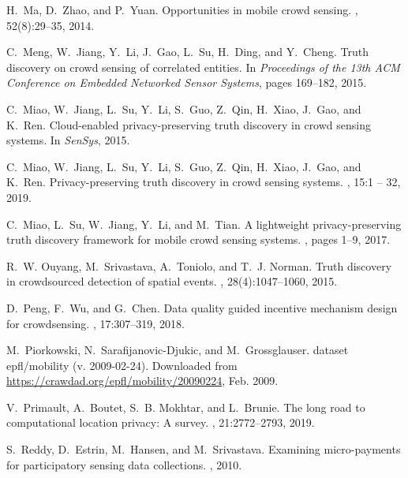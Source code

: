 \documentclass[11pt]{article}
\begin{document}
\begin{thebibliography}{10}
H.~Ma, D.~Zhao, and P.~Yuan.
\newblock Opportunities in mobile crowd sensing.
, 52(8):29--35, 2014.

C.~Meng, W.~Jiang, Y.~Li, J.~Gao, L.~Su, H.~Ding, and Y.~Cheng.
\newblock Truth discovery on crowd sensing of correlated entities.
\newblock In {\em Proceedings of the 13th ACM Conference on Embedded Networked
  Sensor Systems}, pages 169--182, 2015.

C.~Miao, W.~Jiang, L.~Su, Y.~Li, S.~Guo, Z.~Qin, H.~Xiao, J.~Gao, and K.~Ren.
\newblock Cloud-enabled privacy-preserving truth discovery in crowd sensing
  systems.
\newblock In {\em SenSys}, 2015.

C.~Miao, W.~Jiang, L.~Su, Y.~Li, S.~Guo, Z.~Qin, H.~Xiao, J.~Gao, and K.~Ren.
\newblock Privacy-preserving truth discovery in crowd sensing systems.
, 15:1 -- 32, 2019.

C.~Miao, L.~Su, W.~Jiang, Y.~Li, and M.~Tian.
\newblock A lightweight privacy-preserving truth discovery framework for mobile
  crowd sensing systems.
, pages 1--9, 2017.

R.~W. Ouyang, M.~Srivastava, A.~Toniolo, and T.~J. Norman.
\newblock Truth discovery in crowdsourced detection of spatial events.
,
  28(4):1047--1060, 2015.

D.~Peng, F.~Wu, and G.~Chen.
\newblock Data quality guided incentive mechanism design for crowdsensing.
, 17:307--319, 2018.

M.~Piorkowski, N.~Sarafijanovic-Djukic, and M.~Grossglauser.
 dataset epfl/mobility (v. 2009-02-24).
\newblock Downloaded from \url{https://crawdad.org/epfl/mobility/20090224},
  Feb. 2009.

V.~Primault, A.~Boutet, S.~B. Mokhtar, and L.~Brunie.
\newblock The long road to computational location privacy: A survey.
, 21:2772--2793, 2019.

S.~Reddy, D.~Estrin, M.~Hansen, and M.~Srivastava.
\newblock Examining micro-payments for participatory sensing data collections.
, 2010.


\end{thebibliography}
\end{document}
